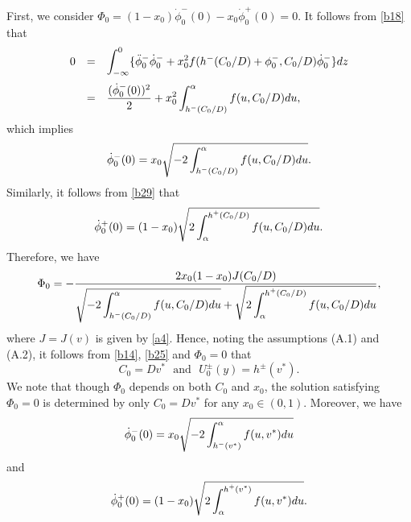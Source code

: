 \documentclass[a4,10pt]{article}
\begin{document}
First, we consider $\Phi_0 =  (1-x_0) \dot{\phi}^-_0(0) - x_0  \dot{\phi}^+_0(0) = 0 $.
It follows from \eqref{b18} that 
%
\[
\begin{array}{rcl}
0 & = & \displaystyle\int_{-\infty}^0 \{ \ddot{\phi}^-_0 \dot{\phi}^-_0
+ x_0^2 f( h^-(C_0/D) + \phi^-_0, C_0/D ) \dot{\phi}^-_0 \} dz 
\\[3ex]
& = & 
\displaystyle\frac{(\dot{\phi}^-_0(0))^2}{2} + x_0^2
\displaystyle\int_{h^-(C_0/D)}^\alpha f(u, C_0/D ) du,
\end{array}
\]
%
which implies 
%
\[
\dot{\phi}^-_0(0) = x_0 \sqrt{-2 \displaystyle\int_{h^-(C_0/D)}^\alpha f(u, C_0/D ) du}. 
\]
%
Similarly, it follows from \eqref{b29} that 
%
\[
\dot{\phi}^+_0(0) = (1-x_0) \sqrt{ 2 \displaystyle\int_\alpha^{h^+(C_0/D)} f(u, C_0/D ) du}. 
\]
%
Therefore, we have
%
\[
\Phi_0 = 
-\displaystyle\frac{ 2 x_0(1-x_0) J(C_0/D)}
{ \sqrt{- 2 \displaystyle\int_{h^-(C_0/D)}^\alpha f(u, C_0/D ) du}
+ \sqrt{  2 \displaystyle\int_\alpha^{h^+(C_0/D)} f(u, C_0/D ) du} },
\]
%
where $J=J(v)$ is given by \eqref{a4}. Hence, noting the assumptions (A.1) and (A.2),
it follows from \eqref{b14}, \eqref{b25} and $\Phi_0 = 0$ that
%
\begin{equation}\label{b35x}
C_0 = Dv^* \ \ \ \text{and} \ \ \ U^{\pm}_0(y) = h^{\pm}(v^*).
\end{equation}
%
We note that though $\Phi_0$ depends on both $C_0$ and $x_0$, the solution satisfying $\Phi_0 = 0$ is determined by only $C_0 = D v^*$ for any $x_0 \in (0,1)$.
Moreover, we have
%
\begin{equation}\label{b36}
\dot{\phi}^-_0(0) = x_0 \sqrt{-2 \displaystyle\int_{h^-(v^*)}^\alpha f(u, v^* ) du}
\end{equation}
%
and
%
\begin{equation}\label{b37}
\dot{\phi}^+_0(0) = (1-x_0) \sqrt{ 2 \displaystyle\int_\alpha^{h^+(v^*)} f(u, v^* ) du}. 
\end{equation}
\end{document}
